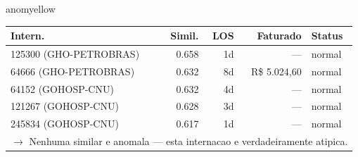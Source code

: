 \documentclass[a4paper,10pt]{article}
\begin{document}
\begin{anomalycard}[Internacao 14520 | GHO-PETROBRAS | MODERADO (z=2.13)]{anomyellow}
\begin{tabular}{l r r r l}\toprule\textbf{Intern.} & \textbf{Simil.} & \textbf{LOS} & \textbf{Faturado} & \textbf{Status} \\\midrule
125300 (GHO-PETROBRAS) & 0.658 & 1d & --- & \textcolor{jcubeblue}{normal} \\
64666 (GHO-PETROBRAS) & 0.632 & 8d & R\$ 5.024,60 & \textcolor{jcubeblue}{normal} \\
64152 (GOHOSP-CNU) & 0.632 & 4d & --- & \textcolor{jcubeblue}{normal} \\
121267 (GOHOSP-CNU) & 0.628 & 3d & --- & \textcolor{jcubeblue}{normal} \\
245834 (GOHOSP-CNU) & 0.617 & 1d & --- & \textcolor{jcubeblue}{normal} \\
\multicolumn{5}{l}{\textcolor{jcubeblue}{\small $\rightarrow$ Nenhuma similar e anomala --- esta internacao e verdadeiramente atipica.}} \\
\bottomrule\end{tabular}


\end{anomalycard}

\newpage
\end{document}
